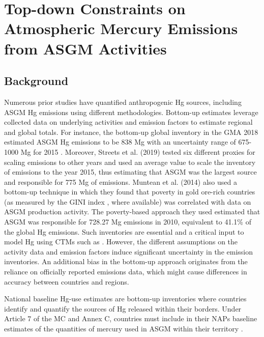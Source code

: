 \chapter{Top-down Constraints on Atmospheric Mercury Emissions from ASGM Activities}\label{Chapter3}
\section{Background}
\begin{flushleft}


 Numerous prior studies have quantified anthropogenic Hg sources, including ASGM Hg emissions using different methodologies. Bottom-up estimates leverage collected data on underlying activities and emission factors to estimate regional and global totals. For instance, the bottom-up global inventory in the GMA 2018 estimated ASGM Hg emissions to be 838 Mg with an uncertainty range of 675-1000 Mg for 2015 \cite{united_nations_environment_programme_technical_2019,steenhuisen_development_2019}. Moreover, Streets et al. (2019) tested six different proxies for scaling emissions to other years and used an average value to scale the inventory of emissions to the year 2015, thus estimating that ASGM was the largest source and responsible for 775 Mg of emissions\cite{streets_global_2019}. Muntean et al. (2014) also used a bottom-up technique in which they found that poverty in gold ore-rich countries (as measured by the GINI index \cite{sadefo_kamdem_nice_2012}, where available) was correlated with data on ASGM production activity. The poverty-based approach they used estimated that ASGM was responsible for 728.27 Mg emissions in 2010, equivalent to 41.1\% of the global Hg emissions\cite{muntean_evaluating_2018}. Such inventories are essential and a critical input to model Hg using CTMs such as \gc. However, the different assumptions on the activity data and emission factors induce significant uncertainty in the emission inventories. An additional bias in the bottom-up approach originates from the reliance on officially reported emissions data, which might cause differences in accuracy between countries and regions. 
 \end{flushleft}
 \begin{flushleft}
    National baseline Hg-use estimates are bottom-up inventories where countries identify and quantify the sources of Hg released within their borders. Under Article 7 of the MC and Annex C, countries must include in their NAPs baseline estimates of the quantities of mercury used in ASGM within their territory \cite{united_nations_environment_programme_estimating_2017}.  
 \end{flushleft}
 



